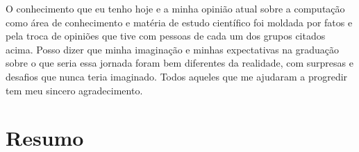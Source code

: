 \documentclass[11pt,twoside,a4paper]{book}
\begin{document}
 O conhecimento que eu tenho hoje e a minha opinião atual sobre a computação como área de conhecimento e matéria de estudo científico foi moldada por fatos e pela troca de opiniões que tive com pessoas de cada um dos grupos citados acima. Posso dizer que minha imaginação e minhas expectativas na graduação sobre o que seria essa jornada foram bem diferentes da realidade, com surpresas e desafios que nunca teria imaginado. Todos aqueles que me ajudaram a progredir tem meu sincero agradecimento.


\chapter*{Resumo}

\end{document}

